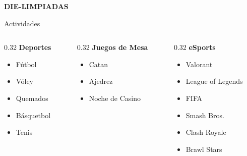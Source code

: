 \documentclass[10pt, aspectratio=169]{beamer}
\begin{document}
\primeraDiapo

\begin{frame}[plain]
    \centering
    {\Huge \bfseries DIE-LIMPIADAS}
\end{frame}

\begin{frame}{Actividades}
    \begin{columns}[t]
        \begin{column}{0.32\textwidth}
            \textbf{Deportes}
            \begin{itemize}
                \item Fútbol
                \item Vóley
                \item Quemados
                \item Básquetbol
                \item Tenis
            \end{itemize}
        \end{column}

        \begin{column}{0.32\textwidth}
            \textbf{Juegos de Mesa}
            \begin{itemize}
                \item Catan
                \item Ajedrez
                \item Noche de Casino
            \end{itemize}
        \end{column}

        \begin{column}{0.32\textwidth}
            \textbf{eSports}
            \begin{itemize}
                \item Valorant
                \item League of Legends
                \item FIFA
                \item Smash Bros.
                \item Clash Royale
                \item Brawl Stars
            \end{itemize}
        \end{column}
    \end{columns}
\end{frame}
\end{document}
